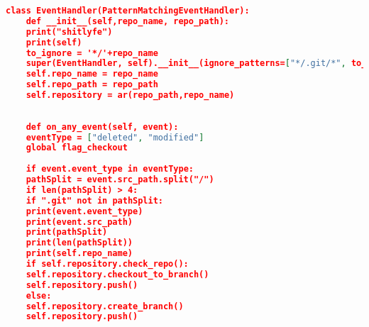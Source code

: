 \begin{lstlisting}[frame=single,tabsize=2,breaklines,caption={Kode sumber Observer.py},label=observer, captionpos=b, language=json]
	class EventHandler(PatternMatchingEventHandler):
	def __init__(self,repo_name, repo_path):
	print("shitlyfe")
	print(self)
	to_ignore = '*/'+repo_name
	super(EventHandler, self).__init__(ignore_patterns=["*/.git/*", to_ignore])
	self.repo_name = repo_name
	self.repo_path = repo_path
	self.repository = ar(repo_path,repo_name)
	
	
	def on_any_event(self, event):
	eventType = ["deleted", "modified"]
	global flag_checkout
	
	if event.event_type in eventType:
	pathSplit = event.src_path.split("/")
	if len(pathSplit) > 4:
	if ".git" not in pathSplit:
	print(event.event_type)
	print(event.src_path)
	print(pathSplit)
	print(len(pathSplit))
	print(self.repo_name)
	if self.repository.check_repo():
	self.repository.checkout_to_branch()
	self.repository.push()
	else:
	self.repository.create_branch()
	self.repository.push()
		
	\end{lstlisting}
	

